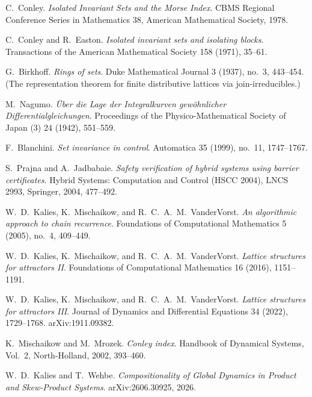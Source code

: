 
C.~Conley.
\emph{Isolated Invariant Sets and the Morse Index}.
CBMS Regional Conference Series in Mathematics 38, American Mathematical
Society, 1978.

C.~Conley and R.~Easton.
\emph{Isolated invariant sets and isolating blocks}.
Transactions of the American Mathematical Society 158 (1971), 35--61.

G.~Birkhoff.
\emph{Rings of sets}.
Duke Mathematical Journal 3 (1937), no.~3, 443--454. (The representation
theorem for finite distributive lattices via join-irreducibles.)

M.~Nagumo.
\emph{\"Uber die Lage der Integralkurven gew\"ohnlicher
Differentialgleichungen}.
Proceedings of the Physico-Mathematical Society of Japan (3) 24 (1942),
551--559.

F.~Blanchini.
\emph{Set invariance in control}.
Automatica 35 (1999), no.~11, 1747--1767.

S.~Prajna and A.~Jadbabaie.
\emph{Safety verification of hybrid systems using barrier certificates}.
Hybrid Systems: Computation and Control (HSCC 2004), LNCS 2993,
Springer, 2004, 477--492.

W.~D.~Kalies, K.~Mischaikow, and R.~C.~A.~M.~VanderVorst.
\emph{An algorithmic approach to chain recurrence}.
Foundations of Computational Mathematics 5 (2005), no.~4, 409--449.

W.~D.~Kalies, K.~Mischaikow, and R.~C.~A.~M.~VanderVorst.
\emph{Lattice structures for attractors II}.
Foundations of Computational Mathematics 16 (2016), 1151--1191.

W.~D.~Kalies, K.~Mischaikow, and R.~C.~A.~M.~VanderVorst.
\emph{Lattice structures for attractors III}.
Journal of Dynamics and Differential Equations 34 (2022), 1729--1768.
arXiv:1911.09382.

K.~Mischaikow and M.~Mrozek.
\emph{Conley index}.
Handbook of Dynamical Systems, Vol.~2, North-Holland, 2002, 393--460.

W.~D.~Kalies and T.~Wehbe.
\emph{Compositionality of Global Dynamics in Product and Skew-Product
Systems}.
arXiv:2606.30925, 2026.
